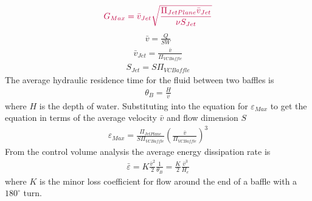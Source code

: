 \documentclass[letterpaper,10pt,english]{sphinxmanual}
\begin{document}
\begin{equation}\label{equation:Rapid_Mix/RM_Derivations:Rapid_Mix/RM_Derivations:94}
\begin{split}\color{purple}{
  G_{Max} = \bar v_{Jet}\sqrt{\frac{\Pi_{JetPlane} \bar v_{Jet}}{\nu S_{Jet}}}
  }\end{split}
\end{equation}\begin{equation}\label{equation:Rapid_Mix/RM_Derivations:Rapid_Mix/RM_Derivations:95}
\begin{split}\bar v = \frac{Q}{SW}\end{split}
\end{equation}\begin{equation}\label{equation:Rapid_Mix/RM_Derivations:Rapid_Mix/RM_Derivations:96}
\begin{split}\bar v_{Jet} = \frac{\bar v}{\Pi_{VCBaffle}}\end{split}
\end{equation}\begin{equation}\label{equation:Rapid_Mix/RM_Derivations:Rapid_Mix/RM_Derivations:97}
\begin{split}S_{Jet} = S \Pi_{VCBaffle}\end{split}
\end{equation}
The average hydraulic residence time for the fluid between two baffles
is
\begin{equation}\label{equation:Rapid_Mix/RM_Derivations:Rapid_Mix/RM_Derivations:98}
\begin{split}\theta_B = \frac{H}{\bar v}\end{split}
\end{equation}
where \(H\) is the depth of water. Substituting into the equation for \(\varepsilon_{Max}\) to get the equation in terms of the average velocity \(\bar v\) and flow dimension \(S\)
\begin{equation}\label{equation:Rapid_Mix/RM_Derivations:Rapid_Mix/RM_Derivations:99}
\begin{split}\varepsilon_{Max}= \frac{\Pi_{JetPlane}}{S \Pi_{VCBaffle}} \left( \frac{ \bar v}{\Pi_{VCBaffle}} \right)^3\end{split}
\end{equation}
From the control volume analysis the average energy dissipation rate is
\begin{equation}\label{equation:Rapid_Mix/RM_Derivations:Rapid_Mix/RM_Derivations:100}
\begin{split}\bar \varepsilon = K \frac{\bar v^2}{2} \frac{1}{\theta_B} = \frac{K}{2} \frac{\bar v^3}{H_e}\end{split}
\end{equation}
where \(K\) is the minor loss coefficient for flow around the end of a baffle with a \(180^\circ\) turn.
\end{document}

